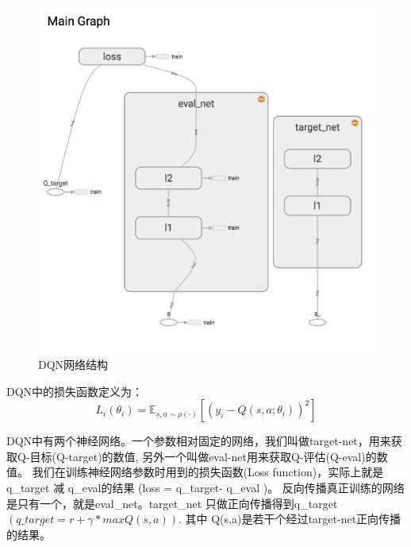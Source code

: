 \begin{figure}[h]
  \centering
  \includegraphics[scale=0.5]{static/dqn.png}
  \caption{DQN网络结构}
\end{figure}
DQN中的损失函数定义为：
\begin{equation}
  \label{DQN:loss}
  L_{i}\left(\theta_{i}\right)=\mathbb{E}_{s, a \sim \rho(\cdot)}\left[\left(y_{i}-Q\left(s, a ; \theta_{i}\right)\right)^{2}\right]
\end{equation}


DQN中有两个神经网络。一个参数相对固定的网络，我们叫做target-net，用来获取Q-目标(Q-target)的数值, 另外一个叫做eval-net用来获取Q-评估(Q-eval)的数值。
我们在训练神经网络参数时用到的损失函数(Loss function)，实际上就是q\_target 减 q\_eval的结果 (loss = q\_target- q\_eval )。
反向传播真正训练的网络是只有一个，就是eval\_net。target\_net 只做正向传播得到q\_target $(q\_target = r +\gamma*max Q(s,a))$. 其中 Q(s,a)是若干个经过target-net正向传播的结果。

